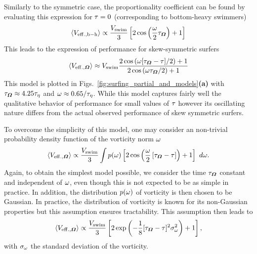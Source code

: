 Similarly to the symmetric case, the proportionality coefficient can be found by evaluating this expression for $\tau = 0$ (corresponding to bottom-heavy swimmers)
\begin{equation}\label{turb:eq:performance_bh_asym}
	\left\langle V_{\mathrm{eff.}, \mathrm{b-h}} \right\rangle \propto \frac{V_{\mathrm{swim}}}{3} \left[ 2 \cos \left( \frac{\omega}{2} \tau_{\boldsymbol{\varOmega}} \right) + 1 \right]
\end{equation}
This leads to the expression of performance for skew-symmetric surfers
\begin{equation}\label{turb:eq:performance_estimation_asym_final}
	 \left\langle V_{\mathrm{eff.}, \boldsymbol{\varOmega}} \right\rangle \approx V_{\mathrm{swim}} \frac{2 \cos \left( \omega [\tau_{\boldsymbol{\varOmega}} - \tau]/2 \right) + 1}{2 \cos \left( \omega \tau_{\boldsymbol{\varOmega}} / 2 \right) + 1}
\end{equation}
This model is plotted in Figs.~\ref{fig:surfing_partial_and_models}\textbf{(a)} with $\tau_{\boldsymbol{\varOmega}} \approx 4.25 \tau_{\eta}$ and $\omega \approx 0.65 / \tau_{\eta}$.
While this model captures fairly well the qualitative behavior of performance for small values of $\tau$ however its oscillating nature differs from the actual observed performance of skew symmetric surfers.

To overcome the simplicity of this model, one may consider an non-trivial probability density function of the vorticity norm $\omega$
\begin{equation}
	\left\langle V_{\mathrm{eff.}, \boldsymbol{\varOmega}} \right\rangle \propto \frac{V_{\mathrm{swim}}}{3} \int p(\omega) \left[ 2 \cos \left( \frac{\omega}{2} \, [\tau_{\boldsymbol{\varOmega}} - \tau] \right) + 1 \right] \,\, d \omega.
\end{equation}
Again, to obtain the simplest model possible, we consider the time $\tau_{\boldsymbol{\varOmega}}$ constant and independent of $\omega$, even though this is not expected to be as simple in practice.
In addition, the distribution $p(\omega)$ of vorticity is then chosen to be Gaussian.
In practice, the distribution of vorticity is known for its non-Gaussian properties \citep{meneveau2011lagrangian} but this assumption ensures tractability.
This assumption then leads to
\begin{equation}
	\left\langle V_{\mathrm{eff.}, \boldsymbol{\varOmega}} \right\rangle \propto \frac{V_{\mathrm{swim}}}{3} \left[ 2 \exp \left( -\frac{1}{8} [ \tau_{\boldsymbol{\varOmega}} - \tau ]^2 \sigma_{\omega}^2 \right) + 1 \right],
\end{equation}
with $\sigma_{\omega}$ the standard deviation of the vorticity.

